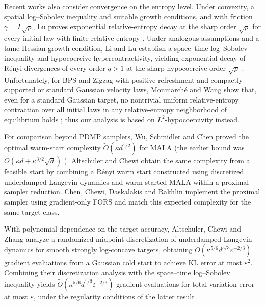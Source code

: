 \documentclass{amsart}
\theoremstyle{plain}
\theoremstyle{definition}
\theoremstyle{remark}
\newcommand{\1}{\mathbf 1}
\begin{document}
Recent works also consider convergence on the entropy level. Under convexity, a spatial log--Sobolev inequality and suitable growth conditions, and with friction $\gamma=\Gamma\sqrt{\rho}$, Lu proves exponential relative-entropy decay at the sharp order $\sqrt{\rho}$ for every initial law with finite relative entropy \cite{LuUnderdampedEntropy}. Under analogous assumptions and a tame Hessian-growth condition, Li and Lu establish a space--time log--Sobolev inequality and hypocoercive hypercontractivity, yielding exponential decay of R\'enyi divergences of every order $q>1$ at the sharp hypocoercive order $\sqrt{\rho}$ \cite{LiLuHypercontractivity}. Unfortunately, for BPS and Zigzag with positive refreshment and compactly supported or standard Gaussian velocity laws, Monmarch\'e and Wang show that, even for a standard Gaussian target, no nontrivial uniform relative-entropy contraction over all initial laws in any relative-entropy neighborhood of equilibrium holds \cite{MonmarcheWangEntropy}; thus our analysis is based on $L^2$-hypocoercivity instead.



For comparison beyond PDMP samplers, Wu, Schmidler and Chen proved the optimal
warm-start complexity $\widetilde O(\kappa d^{1/2})$ for MALA
\cite{WuSchmidlerChen2022} (the earlier bound was
$\widetilde O(\kappa d+\kappa^{3/2}\sqrt d)$
\cite{DwivediChenWainwrightYu2019}).  Altschuler and Chewi
\cite{AltschulerChewi2024} obtain the same complexity from a feasible start by
combining a R\'enyi warm start constructed using discretized underdamped
Langevin dynamics and warm-started MALA within a proximal-sampler reduction.
Chen, Chewi, Daskalakis and Rakhlin
\cite{ChenChewiDaskalakisRakhlin2026} implement the proximal sampler using
gradient-only FORS and match this expected complexity for the same target
class.

With polynomial dependence on the target accuracy, Altschuler, Chewi and Zhang
\cite{AltschulerChewiZhang2026} analyze a randomized-midpoint discretization
of underdamped Langevin dynamics for smooth strongly log-concave targets, obtaining
$\widetilde O(\kappa^{5/6}d^{5/3}\varepsilon^{-2/3})$ gradient evaluations
from a Gaussian cold start to achieve KL error at most $\varepsilon^2$. Combining their discretization analysis with the
space--time log--Sobolev inequality 
\cite{LiLuHypercontractivity} yields
$\widetilde O(\kappa^{5/6}d^{1/3}\varepsilon^{-2/3})$ gradient evaluations for total-variation error at most $\varepsilon$, under the regularity conditions of the latter result
\cite[Theorem~5.3.17]{ChewiLogConcaveSampling}.
\end{document}

